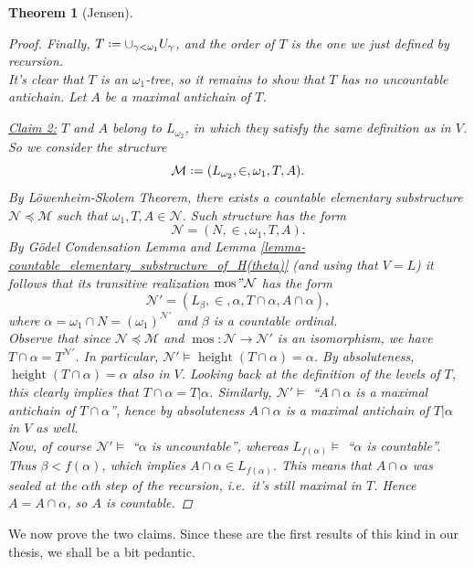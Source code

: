 \documentclass[11pt,a4paper]{report}
\newtheorem{theorem}{Theorem}[chapter] %
\theoremstyle{definition}
\theoremstyle{num.custom-title}
\theoremstyle{custom-title}
\newenvironment{claim}[1]{\par\noindent\underline{Claim#1:}\space}{} %
\DeclareMathOperator{\height}{height}
\DeclareMathOperator{\mos}{mos}
\newcommand{\M}{\mathcal{M}}
\newcommand*{\defeq}{\mathrel{\rlap{%
                     \raisebox{0.3ex}{$\cdot$}}%
                     \raisebox{-0.3ex}{$\cdot$}}%
                     =}
\begin{document}
\begin{theorem}[Jensen]
\begin{proof}
Finally, $T \defeq \cup_{\gamma < \omega_1} U_\gamma$, and the order of $T$ is the one we just defined by recursion.\\
It's clear that $T$ is an $\omega_1$-tree, so it remains to show that $T$ has no uncountable antichain. Let $A$ be a maximal antichain of $T$.\\[-7pt]
\begin{claim}{ 2}
$T$ and $A$ belong to $L_{\omega_2}$, in which they satisfy the same definition as in $V$.
\end{claim}\\[-7pt]

So we consider the structure
\[
\M \defeq (L_{\omega_2}, \in, \omega_1, T, A).
\]
By Löwenheim-Skolem Theorem, there exists a countable elementary substructure $\mathcal{N} \preceq \M$ such that $\omega_1, T, A \in \mathcal{N}$. Such structure has the form
\[
\mathcal{N} = (N, \in, \omega_1, T, A).
\]
By Gödel Condensation Lemma and Lemma \ref{lemma-countable_elementary_substructure_of_H(theta)} (and using that $V=L$) it follows that its transitive realization $\mos"\mathcal{N}$ has the form
\[
\mathcal{N'} = (L_\beta, \in, \alpha, T \cap \alpha, A \cap \alpha),
\]
where $\alpha = \omega_1 \cap N = (\omega_1)^{\mathcal{N'}}$ and $\beta$ is a countable ordinal.\\
Observe that since $\mathcal{N} \preceq \M$ and $\mos \colon \mathcal{N} \to \mathcal{N'}$ is an isomorphism, we have $T \cap \alpha = T^{\mathcal{N'}}$. In particular, $\mathcal{N'} \models \height(T \cap \alpha)=\alpha$. By absoluteness, $\height(T \cap \alpha)=\alpha$ also in $V$. Looking back at the definition of the levels of $T$, this clearly implies that $T \cap \alpha = T|\alpha$. Similarly, $\mathcal{N'} \models$ ``$A \cap \alpha$ is a maximal antichain of $T \cap \alpha$'', hence by absoluteness $A \cap \alpha$ is a maximal antichain of $T|\alpha$ in $V$ as well.\\
Now, of course $\mathcal{N'} \models$ ``$\alpha$ is uncountable'', whereas $L_{f(\alpha)} \models$ ``$\alpha$ is countable''. Thus $\beta < f(\alpha)$, which implies $A \cap \alpha \in L_{f(\alpha)}$. This means that $A \cap \alpha$ was sealed at the $\alpha$th step of the recursion, i.e.\ it's still maximal in $T$. Hence $A = A \cap \alpha$, so $A$ is countable.
\end{proof}
\end{theorem}

We now prove the two claims. Since these are the first results of this kind in our thesis, we shall be a bit pedantic.
\end{document}

